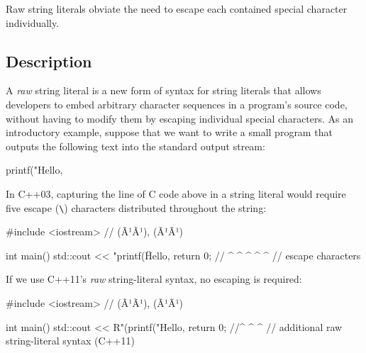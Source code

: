 



\setcounter{table}{0}
\setcounter{footnote}{0}
\setcounter{lstlisting}{0}

Raw string literals obviate the need to escape each contained special
character individually.

\subsection[Description]{Description}\label{description}

A \emph{raw} string literal is a new form of syntax for string literals
that allows developers to embed arbitrary character sequences in a
program's source code, without having to modify them by escaping
individual special characters. As an introductory example, suppose that
we want to write a small program that outputs the following text into the standard output stream:

\begin{emcppslisting}[language=C++]
printf("Hello, %
\end{emcppslisting}
    
\noindent In C++03, capturing the line of C code above in a string literal would
require five escape (\lstinline!\!) characters distributed
throughout the string:

\begin{emcppslisting}[language=C++]
#include <iostream>  // (Ã¹{}Ã¹), (Ã¹{}Ã¹)

int main()
{
    std::cout << "printf(\"Hello, %
    return 0;  //        ^            ^  ^   ^      ^
               //             escape characters
}
\end{emcppslisting}
    
\noindent If we use C++11's \emph{raw} string-literal syntax, no escaping is
required:

\begin{emcppslisting}[language=C++]
#include <iostream>  // (Ã¹{}Ã¹), (Ã¹{}Ã¹)

int main()
{
    std::cout << R"(printf("Hello, %
    return 0;  //^ ^                                      ^
               //   additional raw string-literal syntax (C++11)
}
\end{emcppslisting}
    
